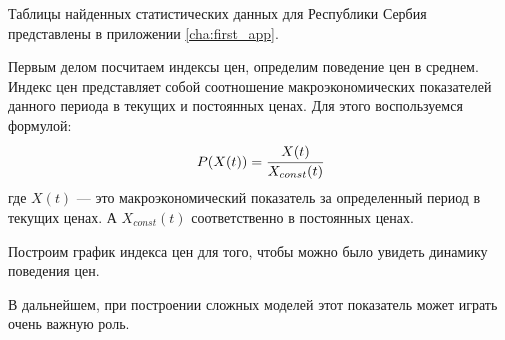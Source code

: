 Таблицы найденных статистических данных для Республики Сербия представлены в приложении \ref{cha:first_app}.

Первым делом посчитаем индексы цен, определим поведение цен в среднем.
Индекс цен представляет собой соотношение макроэкономических показателей данного периода в текущих и постоянных ценах.
Для этого воспользуемся формулой:
\begin{equation*}
	P(X(t)) = \cfrac{X(t)}{X_{const}(t)}
\end{equation*}
где $X(t)$ --- это макроэкономический показатель за определенный период в текущих ценах.
А $X_{const}(t)$ соответственно в постоянных ценах.

Построим график индекса цен для того, чтобы можно было увидеть динамику поведения цен.
\begin{center}
\end{center}
В дальнейшем, при построении сложных моделей этот показатель может играть очень важную роль.

